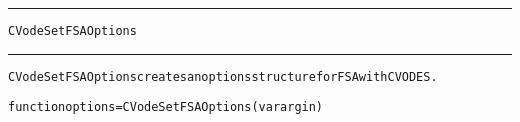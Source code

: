 \begin{samepage}
\hrule
\begin{center}
{\large \verb!CVodeSetFSAOptions!}
\label{p:CVodeSetFSAOptions}
\end{center}
\hrule\vspace{0.1in}



\begin{alltt}
CVodeSetFSAOptions creates an options structure for FSA with CVODES.
\end{alltt}

\end{samepage}



\begin{samepage}


\begin{alltt}
function options = CVodeSetFSAOptions(varargin) 
\end{alltt}

\end{samepage}



